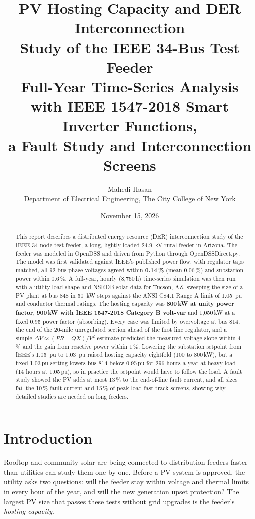 \documentclass[11pt,letterpaper]{article}
\title{\textbf{PV Hosting Capacity and DER Interconnection\\Study of the IEEE 34-Bus Test Feeder}\\[6pt]
\large Full-Year Time-Series Analysis with IEEE 1547-2018 Smart Inverter Functions,\\
a Fault Study and Interconnection Screens}
\author{Mahedi Hasan\\[2pt]
\normalsize Department of Electrical Engineering, The City College of New York}
\date{November 15, 2026}
\begin{document}
\maketitle

\begin{abstract}
\noindent
This report describes a distributed energy resource (DER) interconnection study of the IEEE 34-node test
feeder, a long, lightly loaded \SI{24.9}{kV} rural feeder in Arizona. The feeder was modeled in OpenDSS and
driven from Python through OpenDSSDirect.py. The model was first validated against IEEE's published power
flow: with regulator taps matched, all 92 bus-phase voltages agreed within \textbf{0.14\,\%} (mean
0.06\,\%) and substation power within 0.6\,\%. A full-year, hourly (8{,}760\,h) time-series simulation was then
run with a utility load shape and NSRDB solar data for Tucson, AZ, sweeping the size of a PV plant at bus 848
in \SI{50}{kW} steps against the ANSI C84.1 Range A limit of \SI{1.05}{pu} and conductor thermal ratings.
The hosting capacity was \textbf{800\,kW at unity power factor}, \textbf{900\,kW with IEEE 1547-2018
Category B volt-var} and 1{,}050\,kW at a fixed 0.95 power factor (absorbing). Every case was limited by
overvoltage at bus 814, the end of the 20-mile unregulated section ahead of the first line regulator, and a
simple $\Delta V \approx (PR-QX)/V^2$ estimate predicted the measured voltage slope within 4\,\% and the gain from
reactive power within 1\,\%. Lowering the substation setpoint from IEEE's \SI{1.05}{pu} to \SI{1.03}{pu}
raised hosting capacity eightfold (100 to 800\,kW), but a fixed 1.03\,pu setting lowers bus 814 below
0.95\,pu for 296 hours a year at heavy load (14 hours at 1.05\,pu), so in practice the setpoint would have to follow
the load. A fault study showed the PV adds at most 13\,\% to the
end-of-line fault current, and all sizes fail the 10\,\% fault-current and 15\,\%-of-peak-load fast-track screens,
showing why detailed studies are needed on long feeders.
\end{abstract}

\tableofcontents
\newpage

\section{Introduction}
Rooftop and community solar are being connected to distribution feeders faster than utilities can study
them one by one. Before a PV system is approved, the utility asks two questions: will the feeder stay within
voltage and thermal limits in every hour of the year, and will the new generation upset protection? The
largest PV size that passes these tests without grid upgrades is the feeder's \emph{hosting capacity}.
\end{document}

